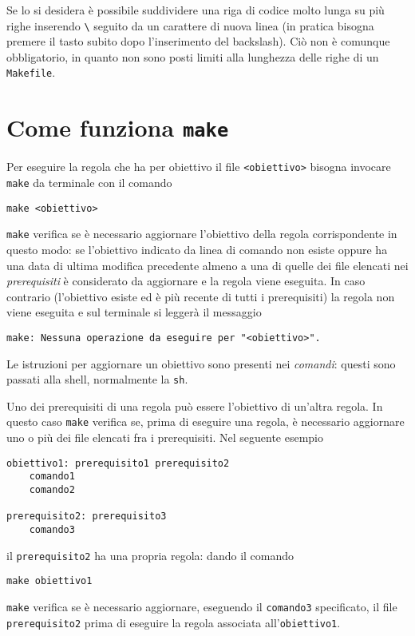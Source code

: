 Se lo si desidera è possibile suddividere una riga di codice molto lunga su più
righe inserendo \verb|\| seguito da un carattere di nuova linea (in pratica
bisogna premere il tasto  subito dopo l'inserimento del
backslash).  Ciò non è comunque obbligatorio, in quanto non sono posti limiti
alla lunghezza delle righe di un \verb|Makefile|.


\section{Come funziona \texttt{make}}
\label{sec:come-funziona}

Per eseguire la regola che ha per obiettivo il file \verb|<obiettivo>| bisogna
invocare \verb|make| da terminale con il comando
\begin{verbatim}
make <obiettivo>
\end{verbatim}
\verb|make| verifica se è necessario aggiornare l'obiettivo della regola
corrispondente in questo modo: se l'obiettivo indicato da linea di comando non
esiste oppure ha una data di ultima modifica precedente almeno a una di quelle
dei file elencati nei \emph{prerequisiti} è considerato da aggiornare e la
regola viene eseguita.  In caso contrario (l'obiettivo esiste ed è più recente
di tutti i prerequisiti) la regola non viene eseguita e sul terminale si leggerà
il messaggio
\begin{verbatim}
make: Nessuna operazione da eseguire per "<obiettivo>".
\end{verbatim}
Le istruzioni per aggiornare un obiettivo sono
presenti nei \emph{comandi}: questi sono passati alla shell, normalmente la
\verb|sh|.

Uno dei prerequisiti di una regola può essere l'obiettivo di un'altra regola.
In questo caso \verb|make| verifica se, prima di eseguire una regola, è
necessario aggiornare uno o più dei file elencati fra i prerequisiti.  Nel
seguente esempio
\begin{lstlisting}
obiettivo1: prerequisito1 prerequisito2
	comando1
	comando2

prerequisito2: prerequisito3
	comando3
\end{lstlisting}
il \verb|prerequisito2| ha una propria regola: dando il comando
\begin{verbatim}
make obiettivo1
\end{verbatim}
\verb|make| verifica se è necessario aggiornare, eseguendo il \verb|comando3|
specificato, il file \verb|prerequisito2| prima di eseguire la regola associata
all'\verb|obiettivo1|.

